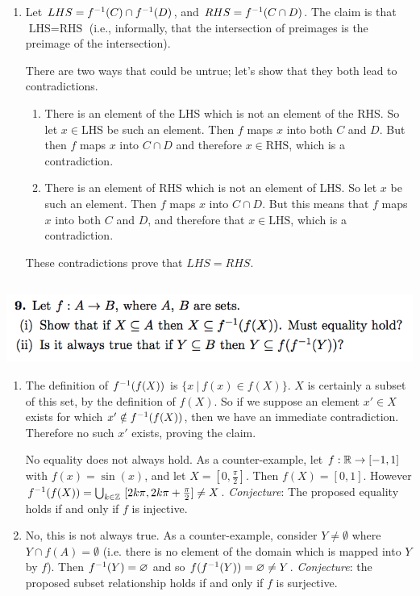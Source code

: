\documentclass[12pt]{article}
\newcommand{\LHS}{\text{LHS}}
\newcommand{\RHS}{\text{RHS}}
\begin{document}
\begin{mdframed}
\begin{enumerate}[label=(\roman*)]
  \item Let $LHS = f^{-1}(C) \cap f^{-1}(D)$, and $RHS = f^{-1}(C \cap D)$. The claim
    is that $\LHS = \RHS$ (i.e., informally, that the intersection of preimages
    is the preimage of the intersection).

    There are two ways that could be untrue; let's show that they both lead to
    contradictions.
    \begin{enumerate}
    \item There is an element of the LHS which is not an element of the RHS. So
      let $x \in \LHS$ be such an element. Then $f$ maps $x$ into both $C$ and
      $D$. But then $f$ maps $x$ into $C \cap D$ and therefore $x \in \RHS$,
      which is a contradiction.
    \item There is an element of RHS which is not an element of LHS. So let $x$
      be such an element. Then $f$ maps $x$ into $C \cap D$. But this means
      that $f$ maps $x$ into both $C$ and $D$, and therefore that
      $x \in \LHS$, which is a contradiction.
    \end{enumerate}
    These contradictions prove that $LHS=RHS$.


  \end{enumerate}
\end{mdframed}

\newpage
\subsection*{} %
\includegraphics[width=400pt]{img/iulm-1-9.png}
\begin{mdframed}
\begin{enumerate}[label=(\roman*)]
\item The definition of $f^{-1}(f(X))$ is $\{x~|~f(x) \in f(X)\}$. $X$ is
  certainly a subset of this set, by the definition of $f(X)$. So if we suppose
  an element $x' \in X$ exists for which $x' \notin f^{-1}(f(X))$, then we have
  an immediate contradiction. Therefore no such $x'$ exists, proving the
  claim.

  No equality does not always hold. As a counter-example, let
  $f: \mathbb{R} \to [-1, 1]$ with $f(x) = \sin(x)$, and let $X = [0,
  \frac{\pi}{2}]$. Then $f(X) = [0, 1]$. However
  $f^{-1}(f(X)) = \bigcup_{k \in \mathbb{Z}} ~[2k\pi, 2k\pi + \frac{\pi}{2}] \neq X$.
  \textit{Conjecture}: The proposed equality holds if and only if $f$ is
  injective.

\item No, this is not always true. As a counter-example, consider
  $Y \neq \emptyset$ where $Y \cap f(A) = \emptyset$ (i.e. there is no element
  of the domain which is mapped into $Y$ by $f$). Then $f^{-1}(Y) = \varnothing$
  and so $f(f^{-1}(Y)) = \varnothing \neq Y$. \textit{Conjecture}: the proposed
  subset relationship holds if and only if $f$ is surjective.
\end{enumerate}
\end{mdframed}
\end{document}

